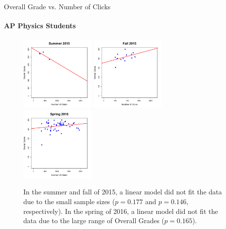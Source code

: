 \documentclass[xcolor=x11names,compress]{beamer}
\begin{document}
\begin{frame}{Overall Grade vs. Number of Clicks}
	\framesubtitle{AP Physics Students}
	\begin{figure}
		\centering
		\includegraphics[width=0.33\textwidth]{img/overall_grade_vs_clicks_su15_ap_students.pdf}
		\includegraphics[width=0.33\textwidth]{img/overall_grade_vs_clicks_fa15_ap_students.pdf}
		\includegraphics[width=0.33\textwidth]{img/overall_grade_vs_clicks_sp16_ap_students.pdf}
		\caption{In the summer and fall of 2015, a linear model did not fit the data due to the small sample sizes ($p = 0.177$ and $p = 0.146$, respectively). In the spring of 2016, a linear model did not fit the data due to the large range of Overall Grades ($p = 0.165$).}
		\label{fig:overall_grade_vs_clicks_ap_students}
	\end{figure}
\end{frame}

\end{document}
